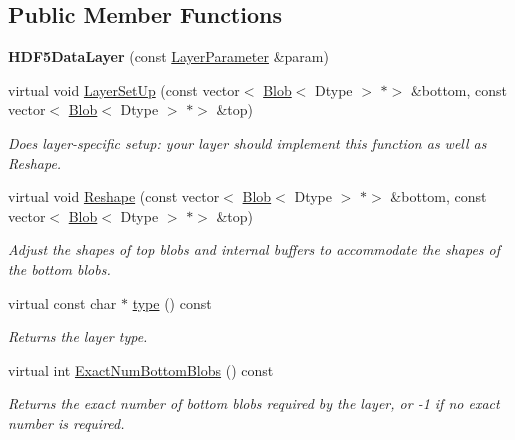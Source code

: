 \subsection*{Public Member Functions}
\begin{DoxyCompactItemize}
\item 
\mbox{\label{classcaffe_1_1_h_d_f5_data_layer_abfc7dcc4f07c228eb0deb1e0dfae1a5f}} 
{\bfseries H\+D\+F5\+Data\+Layer} (const \mbox{\hyperlink{classcaffe_1_1_layer_parameter}{Layer\+Parameter}} \&param)
\item 
virtual void \mbox{\hyperlink{classcaffe_1_1_h_d_f5_data_layer_afcd473ff34b4035122ba9119fc67498c}{Layer\+Set\+Up}} (const vector$<$ \mbox{\hyperlink{classcaffe_1_1_blob}{Blob}}$<$ Dtype $>$ $\ast$$>$ \&bottom, const vector$<$ \mbox{\hyperlink{classcaffe_1_1_blob}{Blob}}$<$ Dtype $>$ $\ast$$>$ \&top)
\begin{DoxyCompactList}\small\item\em Does layer-\/specific setup\+: your layer should implement this function as well as Reshape. \end{DoxyCompactList}\item 
virtual void \mbox{\hyperlink{classcaffe_1_1_h_d_f5_data_layer_a38b8924648ba4ab2933fe389fa608cad}{Reshape}} (const vector$<$ \mbox{\hyperlink{classcaffe_1_1_blob}{Blob}}$<$ Dtype $>$ $\ast$$>$ \&bottom, const vector$<$ \mbox{\hyperlink{classcaffe_1_1_blob}{Blob}}$<$ Dtype $>$ $\ast$$>$ \&top)
\begin{DoxyCompactList}\small\item\em Adjust the shapes of top blobs and internal buffers to accommodate the shapes of the bottom blobs. \end{DoxyCompactList}\item 
\mbox{\label{classcaffe_1_1_h_d_f5_data_layer_a717c78e3de84c43061f5a6d7421104d1}} 
virtual const char $\ast$ \mbox{\hyperlink{classcaffe_1_1_h_d_f5_data_layer_a717c78e3de84c43061f5a6d7421104d1}{type}} () const
\begin{DoxyCompactList}\small\item\em Returns the layer type. \end{DoxyCompactList}\item 
virtual int \mbox{\hyperlink{classcaffe_1_1_h_d_f5_data_layer_a4eb72974cea32c84acb6b8012a0d326b}{Exact\+Num\+Bottom\+Blobs}} () const
\begin{DoxyCompactList}\small\item\em Returns the exact number of bottom blobs required by the layer, or -\/1 if no exact number is required. \end{DoxyCompactList}\item 

\end{DoxyCompactItemize}

